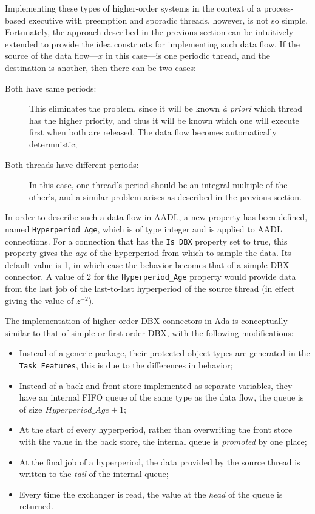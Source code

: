 Implementing these types of higher-order systems in the context of a
process-based executive with preemption and sporadic threads, however,
is not so simple. Fortunately, the approach described in the previous
section can be intuitively extended to provide the idea constructs for
implementing such data flow. If the source of the data flow---$x$ in
this case---is one periodic thread, and the destination is another,
then there can be two cases:

\begin{description}
\item[Both have same periods:]{This eliminates the problem, since it
  will be known \emph{\`a priori} which thread has the higher
  priority, and thus it will be known which one will execute first
  when both are released. The data flow becomes automatically
  determnistic;}
\item[Both threads have different periods:]{In this case, one thread's
  period should be an integral multiple of the other's, and a similar
  problem arises as described in the previous section.}
\end{description}

In order to describe such a data flow in AADL, a new property has been
defined, named \texttt{Hyperperiod\_Age}, which is of type integer and
is applied to AADL connections. For a connection that has the
\texttt{Is\_DBX} property set to true, this property gives the
\emph{age} of the hyperperiod from which to sample the data. Its
default value is 1, in which case the behavior becomes that of a
simple DBX connector. A value of 2 for the \texttt{Hyperperiod\_Age}
property would provide data from the last job of the last-to-last
hyperperiod of the source thread (in effect giving the value of
$z^{-2}$).

The implementation of higher-order DBX connectors in Ada is
conceptually similar to that of simple or first-order DBX, with the
following modifications:

\begin{itemize}
\item{Instead of a generic package, their protected object types are
  generated in the \texttt{Task\_Features}, this is due to the
  differences in behavior;}
\item{Instead of a back and front store implemented as separate
  variables, they have an internal FIFO queue of the same type as the
  data flow, the queue is of size $Hyperperiod\_Age+1$;}
\item{At the start of every hyperperiod, rather than overwriting the
  front store with the value in the back store, the internal queue is
  \emph{promoted} by one place;}
\item{At the final job of a hyperperiod, the data provided by the
  source thread is written to the \emph{tail} of the internal queue;}
\item{Every time the exchanger is read, the value at the \emph{head}
  of the queue is returned.}
\end{itemize}

